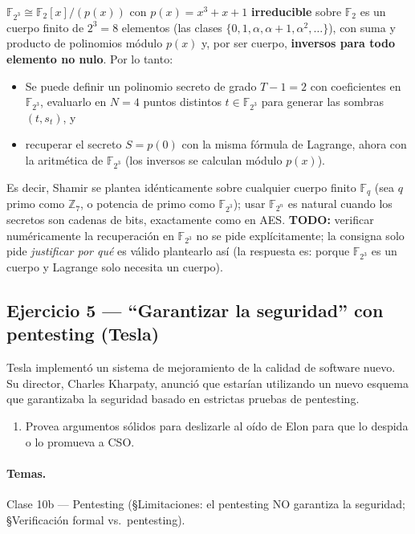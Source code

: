 $\mathbb{F}_{2^3}\cong\mathbb{F}_2[x]/(p(x))$ con $p(x)=x^3+x+1$ \textbf{irreducible} sobre
$\mathbb{F}_2$ es un cuerpo finito de $2^3=8$ elementos (las clases
$\{0,1,\alpha,\alpha+1,\alpha^2,\dots\}$), con suma y producto de polinomios módulo $p(x)$ y,
por ser cuerpo, \textbf{inversos para todo elemento no nulo}. Por lo tanto:
\begin{itemize}
  \item Se puede definir un polinomio secreto de grado $T-1=2$ con coeficientes en
  $\mathbb{F}_{2^3}$, evaluarlo en $N=4$ puntos distintos $t\in\mathbb{F}_{2^3}$ para generar
  las sombras $(t,s_t)$, y
  \item recuperar el secreto $S=p(0)$ con la misma fórmula de Lagrange, ahora con la
  aritmética de $\mathbb{F}_{2^3}$ (los inversos se calculan módulo $p(x)$).
\end{itemize}
Es decir, Shamir se plantea idénticamente sobre cualquier cuerpo finito $\mathbb{F}_q$ (sea
$q$ primo como $\mathbb{Z}_7$, o potencia de primo como $\mathbb{F}_{2^3}$); usar
$\mathbb{F}_{2^n}$ es natural cuando los secretos son cadenas de bits, exactamente como en
AES. \textbf{TODO:} verificar numéricamente la recuperación en $\mathbb{F}_{2^3}$ no se pide
explícitamente; la consigna solo pide \emph{justificar por qué} es válido plantearlo así
(la respuesta es: porque $\mathbb{F}_{2^3}$ es un cuerpo y Lagrange solo necesita un cuerpo).

\subsection{Ejercicio 5 --- ``Garantizar la seguridad'' con pentesting (Tesla)}

\begin{consigna}
Tesla implementó un sistema de mejoramiento de la calidad de software nuevo. Su director,
Charles Kharpaty, anunció que estarían utilizando un nuevo esquema que garantizaba la
seguridad basado en estrictas pruebas de pentesting.
\begin{enumerate}
  \item[a)] Provea argumentos sólidos para deslizarle al oído de Elon para que lo despida o
  lo promueva a CSO.
\end{enumerate}
\end{consigna}

\paragraph{Temas.}
Clase 10b --- Pentesting (\S Limitaciones: el pentesting NO garantiza la seguridad;
\S Verificación formal vs.\ pentesting).

